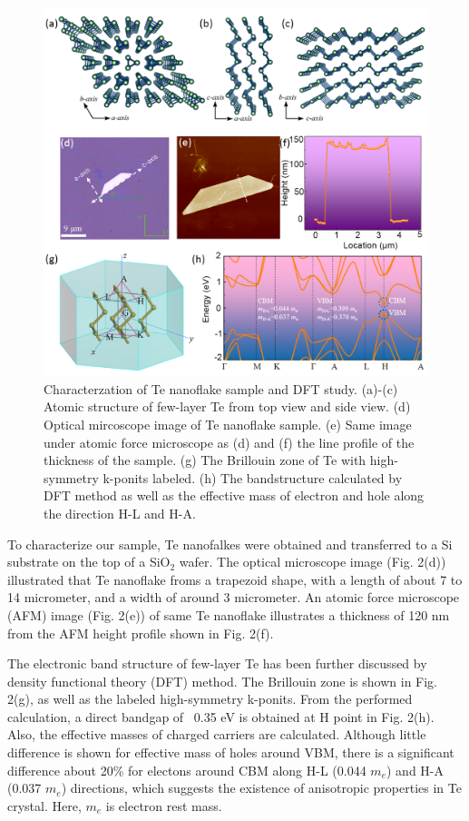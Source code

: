 \documentclass[journal=jacsat,manuscript=article]{achemso}
\begin{document}
\begin{figure}
  \centering
  \includegraphics[width=\linewidth]{AFM.png}
  \caption{Characterzation of Te nanoflake sample and DFT study. (a)-(c) Atomic structure of few-layer Te from top view and side view.  (d) Optical mircoscope image of Te nanoflake sample. (e) Same image under atomic force microscope as (d) and (f) the line profile of the thickness of the sample. (g) The Brillouin zone of  Te with high-symmetry k-ponits labeled. (h) The bandstructure calculated by DFT method as well as the effective mass of electron and hole along the direction H-L and H-A.}
    \label{fig:AFM}
\end{figure}

To characterize our sample, Te nanofalkes were obtained and transferred to a Si substrate on the top of a SiO$_2$ wafer. The optical microscope image (Fig. 2(d)) illustrated that Te nanoflake froms a trapezoid shape, with a length of about 7 to 14 micrometer, and a width of around 3 micrometer. An atomic force microscope (AFM) image (Fig. 2(e)) of same Te nanoflake illustrates a thickness of 120 nm from the AFM height profile shown in Fig. 2(f). 

The electronic band structure of few-layer Te has been further discussed by density functional theory (DFT) method. The Brillouin zone is shown in Fig. 2(g), as well as the labeled high-symmetry k-ponits. From the performed calculation, a direct bandgap of ~0.35 eV is obtained at H point in Fig. 2(h). Also, the effective masses of charged carriers are calculated. Although little difference is shown for effective mass of holes around VBM, there is a significant difference about 20\% for electons around CBM along H-L (0.044 $m_e$) and H-A (0.037 $m_e$) directions, which suggests the existence of anisotropic properties in Te crystal. Here, $m_e$ is electron rest mass.  
\end{document}
